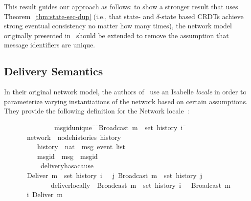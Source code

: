 This result guides our approach as follows: to show a stronger result that uses
Theorem~\ref{thm:state-sec-dup} (i.e., that state- and $\delta$-state based
CRDTs achieve strong eventual consistency no matter how many times), the network
model originally presented in~\citep{gomes17} should be extended to remove the
assumption that message identifiers are unique.

\subsection{Delivery Semantics}
In their original network model, the authors of~\citep{gomes17} use an Isabelle
\textit{locale} in order to parameterize varying instantiations of the network
based on certain assumptions. They provide the following definition for the
Network locale~\citep{gomes17}:
\begin{figure}[H]
\begin{isabelle}
~~~~~~~~\ \=msg{\isacharunderscore}id{\isacharunderscore}unique{\isacharcolon}\ \={\isasymrbrakk}\ \={\isachardoublequoteopen}Broadcast\ m\ {\isasymin}\ set\ {\isacharparenleft}history\ i{\isacharparenright}\ \=\kill
{}\ network\ {\isacharequal}\ node{\isacharunderscore}histories\ history\\
~~~~\>history\ {\isacharcolon}{\isacharcolon}\ {\isachardoublequoteopen}nat\ {\isasymRightarrow}\ {\isacharprime}msg\ event\ list{\isachardoublequoteclose}\ {\isacharplus}\\
~~~~\>msg{\isacharunderscore}id\ {\isacharcolon}{\isacharcolon}\ {\isachardoublequoteopen}{\isacharprime}msg\ {\isasymRightarrow}\ {\isacharprime}msgid{\isachardoublequoteclose}\\
~~~~\ delivery{\isacharunderscore}has{\isacharunderscore}a{\isacharunderscore}cause{\isacharcolon}\\
\>\>{\isasymlbrakk}\ {\isachardoublequoteopen}Deliver\ m\ {\isasymin}\ set\ {\isacharparenleft}history\ i{\isacharparenright}\ \>\>{\isasymrbrakk}\ {\isasymLongrightarrow}\ {\isasymexists}j{\isachardot}\ Broadcast\ m\ {\isasymin}\ set\ {\isacharparenleft}history\ j{\isacharparenright}{\isachardoublequoteclose}\\
~~~~~~~~\>deliver{\isacharunderscore}locally{\isacharcolon}\ \>{\isasymlbrakk}\ \>{\isachardoublequoteopen}Broadcast\ m\ {\isasymin}\ set\ {\isacharparenleft}history\ i{\isacharparenright}\ \>{\isasymrbrakk}\ {\isasymLongrightarrow}\  Broadcast\ m\ {\isasymsqsubset}\isactrlsup i\ Deliver\ m{\isachardoublequoteclose}\\

\end{isabelle}
\end{figure}
